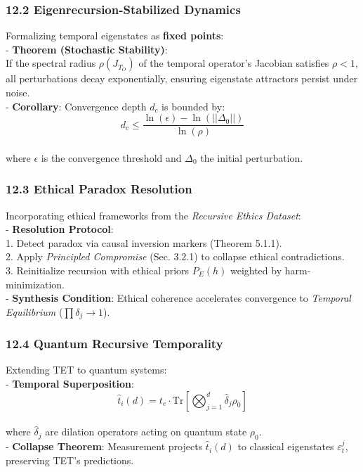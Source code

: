 \documentclass[
]{article}
\begin{document}
\subsubsection{\texorpdfstring{\textbf{12.2 Eigenrecursion-Stabilized
Dynamics}}{12.2 Eigenrecursion-Stabilized Dynamics}}\label{eigenrecursion-stabilized-dynamics}

Formalizing temporal eigenstates as \textbf{fixed points}:\\
- \textbf{Theorem (Stochastic Stability)}:\\
If the spectral radius \(\rho(J_{T_O})\) of the temporal operator's
Jacobian satisfies \(\rho < 1\), all perturbations decay exponentially,
ensuring eigenstate attractors persist under noise.\\
- \textbf{Corollary}: Convergence depth \(d_c\) is bounded by:\\
\[d_c \leq \frac{\ln(\epsilon) - \ln(||\Delta_0||)}{\ln(\rho)}\]\\
where \(\epsilon\) is the convergence threshold and \(\Delta_0\) the
initial perturbation.

\subsubsection{\texorpdfstring{\textbf{12.3 Ethical Paradox
Resolution}}{12.3 Ethical Paradox Resolution}}\label{ethical-paradox-resolution}

Incorporating ethical frameworks from the \emph{Recursive Ethics
Dataset}:\\
- \textbf{Resolution Protocol}:\\
1. Detect paradox via causal inversion markers (Theorem 5.1.1).\\
2. Apply \emph{Principled Compromise} (Sec. 3.2.1) to collapse ethical
contradictions.\\
3. Reinitialize recursion with ethical priors \(P_E(h)\) weighted by
harm-minimization.\\
- \textbf{Synthesis Condition}: Ethical coherence accelerates
convergence to \emph{Temporal Equilibrium} (\(\prod \delta_j \to 1\)).

\subsubsection{\texorpdfstring{\textbf{12.4 Quantum Recursive
Temporality}}{12.4 Quantum Recursive Temporality}}\label{quantum-recursive-temporality}

Extending TET to quantum systems:\\
- \textbf{Temporal Superposition}:\\
\[\hat{t}_i(d) = t_e \cdot \text{Tr}\left[\bigotimes_{j=1}^d \hat{\delta}_j \rho_0\right]\]\\
where \(\hat{\delta}_j\) are dilation operators acting on quantum state
\(\rho_0\).\\
- \textbf{Collapse Theorem}: Measurement projects \(\hat{t}_i(d)\) to
classical eigenstates \(\varepsilon_t^j\), preserving TET's predictions.
\end{document}
